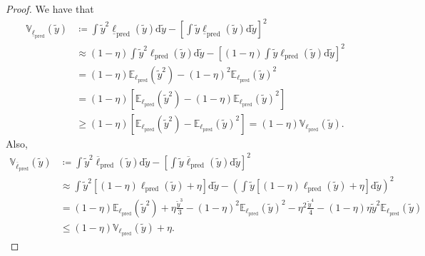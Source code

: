 \documentclass[10pt,a4paper]{amsart}
\begin{document}
\begin{proof}
    We have that
    \begin{align*}
        \mathbb{V}_{\underline{\ell}_\text{pred}}(\tilde{y}) &\coloneqq \int \tilde{y}^2 \underline{\ell}_\text{pred}(\tilde{y}) \text{d}\tilde{y} - \left[\int \tilde{y} \underline{\ell}_\text{pred}(\tilde{y}) \text{d}\tilde{y}\right]^2\\
        &\approx (1-\eta) \int \tilde{y}^2 {\ell}_\text{pred}(\tilde{y}) \text{d}\tilde{y} - \left[(1-\eta) \int \tilde{y} {\ell}_\text{pred}(\tilde{y}) \text{d}\tilde{y}\right]^2\\
        &= (1-\eta) \mathbb{E}_{\ell_\text{pred}}(\tilde{y}^2) - (1-\eta)^2 \mathbb{E}_{\ell_\text{pred}}(\tilde{y})^2\\
        &= (1-\eta) \left[ \mathbb{E}_{\ell_\text{pred}}(\tilde{y}^2) - (1-\eta) \mathbb{E}_{\ell_\text{pred}}(\tilde{y})^2 \right]\\
        &\geq (1-\eta) \left[ \mathbb{E}_{\ell_\text{pred}}(\tilde{y}^2) - \mathbb{E}_{\ell_\text{pred}}(\tilde{y})^2 \right] = (1-\eta) \mathbb{V}_{\ell_\text{pred}}(\tilde{y}).
    \end{align*}
    Also,
    \begin{align*}
        \mathbb{V}_{\overline{\ell}_\text{pred}}(\tilde{y}) &\coloneqq \int \tilde{y}^2 \overline{\ell}_\text{pred}(\tilde{y}) \text{d}\tilde{y} - \left[\int \tilde{y} \overline{\ell}_\text{pred}(\tilde{y}) \text{d}\tilde{y}\right]^2\\
        &\approx \int \tilde{y}^2 \left[ (1-\eta) {\ell}_\text{pred}(\tilde{y}) +\eta \right] \text{d}\tilde{y} - \left(\int \tilde{y} \left[(1-\eta) {\ell}_\text{pred}(\tilde{y}) + \eta \right] \text{d}\tilde{y}\right)^2\\
        &= (1-\eta) \mathbb{E}_{\ell_\text{pred}}(\tilde{y}^2) + \eta \frac{\tilde y ^3}{3} - (1-\eta)^2 \mathbb{E}_{\ell_\text{pred}}(\tilde{y})^2 -\eta^2 \frac{\tilde y ^4}{4} - (1-\eta) \eta \tilde{y}^2 \mathbb{E}_{\ell_\text{pred}}(\tilde{y})\\
        &\leq (1-\eta) \mathbb{V}_{{\ell}_\text{pred}}(\tilde{y}) + \eta.
    \end{align*}
\end{proof}
\end{document}
